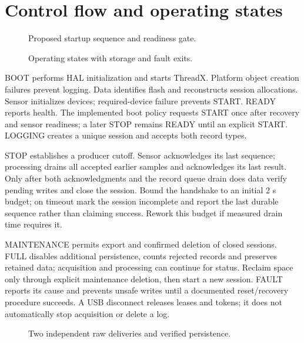 \section{Control flow and operating states}
\begin{figure}[htbp]\centering\caption{Proposed startup sequence and readiness gate.}\end{figure}
\begin{figure}[htbp]\centering\caption{Operating states with storage and fault exits.}\end{figure}
BOOT performs HAL initialization and starts ThreadX. Platform object creation failures prevent logging. Data identifies flash and reconstructs session allocations. Sensor initializes devices; required-device failure prevents START. READY reports health. The implemented boot policy requests START once after recovery and sensor readiness; a later STOP remains READY until an explicit START. LOGGING creates a unique session and accepts both record types.

STOP establishes a producer cutoff. Sensor acknowledges its last sequence; processing drains all accepted earlier samples and acknowledges its last result. Only after both acknowledgments and the record queue drain does data verify pending writes and close the session. Bound the handshake to an initial 2 s budget; on timeout mark the session incomplete and report the last durable sequence rather than claiming success. Rework this budget if measured drain time requires it.

MAINTENANCE permits export and confirmed deletion of closed sessions. FULL disables additional persistence, counts rejected records and preserves retained data; acquisition and processing can continue for status. Reclaim space only through explicit maintenance deletion, then start a new session. FAULT reports its cause and prevents unsafe writes until a documented reset/recovery procedure succeeds. A USB disconnect releases leases and tokens; it does not automatically stop acquisition or delete a log.

\begin{figure}[htbp]\centering\caption{Two independent raw deliveries and verified persistence.}\end{figure}
